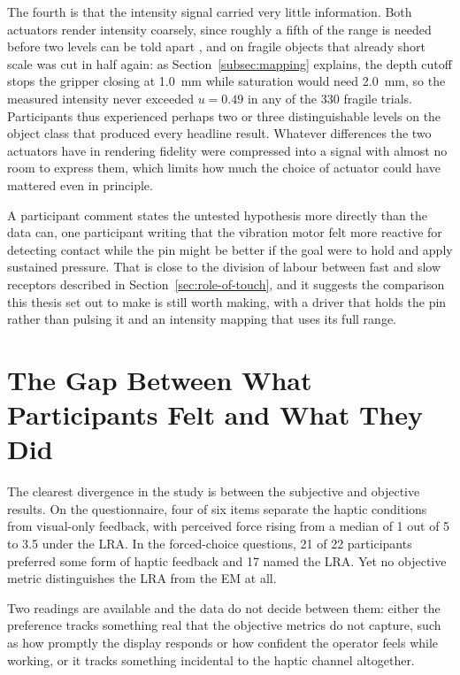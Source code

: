 \documentclass[12pt, a4paper, twoside, openright]{report}
\begin{document}
The fourth is that the intensity signal carried very little information. Both
actuators render intensity coarsely, since roughly a fifth of the range is
needed before two levels can be told apart \cite{choi2013}, and on fragile
objects that already short scale was cut in half again: as
Section~\ref{subsec:mapping} explains, the depth cutoff stops the gripper
closing at \SI{1.0}{\milli\metre} while saturation would need
\SI{2.0}{\milli\metre}, so the measured intensity never exceeded $u = 0.49$ in
any of the 330 fragile trials. Participants thus experienced perhaps two or
three distinguishable levels on the object class that produced every headline
result. Whatever differences the two actuators have in rendering fidelity were
compressed into a signal with almost no room to express them, which limits how
much the choice of actuator could have mattered even in principle.

A participant comment states the untested hypothesis more directly than the
data can, one participant writing that the vibration motor felt more reactive
for detecting contact while the pin might be better if the goal were to hold
and apply sustained pressure. That is close to the division of labour between
fast and slow receptors described in Section~\ref{sec:role-of-touch}, and it
suggests the comparison this thesis set out to make is still worth making, with
a driver that holds the pin rather than pulsing it and an intensity mapping that
uses its full range.

\section{The Gap Between What Participants Felt and What They Did}
\label{sec:subjective-objective}

The clearest divergence in the study is between the subjective and objective
results. On the questionnaire, four of six items separate the haptic conditions
from visual-only feedback, with perceived force rising from a median of 1 out
of 5 to 3.5 under the LRA. In the forced-choice questions, 21 of 22
participants preferred some form of haptic feedback and 17 named the LRA. Yet
no objective metric distinguishes the LRA from the EM at all.

Two readings are available and the data do not decide between them: either the
preference tracks something real that the objective metrics do not capture,
such as how promptly the display responds or how confident the operator feels
while working, or it tracks something incidental to the haptic channel
altogether.
\end{document}
